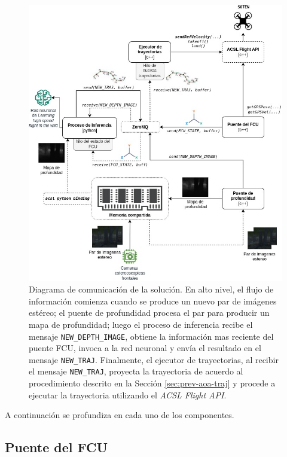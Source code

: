 \begin{figure}[H]
    \centering
    \includegraphics[scale=0.5]{partes/img/Solution-V3-Spanish.jpg}
    \caption[Diagrama de comunicación de la solución.]{Diagrama de comunicación de la solución. En alto nivel, el flujo de información comienza cuando se produce un nuevo par de imágenes estéreo; el puente de profundidad procesa el par para producir un mapa de profundidad; luego el proceso de inferencia recibe el mensaje \texttt{NEW\_DEPTH\_IMAGE}, obtiene la información mas reciente del puente FCU, invoca a la red neuronal y envía el resultado en el mensaje \texttt{NEW\_TRAJ}. Finalmente, el ejecutor de trayectorias, al recibir el mensaje \texttt{NEW\_TRAJ}, proyecta la trayectoria de acuerdo al procedimiento descrito en la Sección \ref{sec:prev-aoa-traj} y procede a ejecutar la trayectoria utilizando el \textit{ACSL Flight API}.}
    \label{fig:sol-comm}
\end{figure}

A continuación se profundiza en cada uno de los componentes.

\subsection{Puente del FCU}


